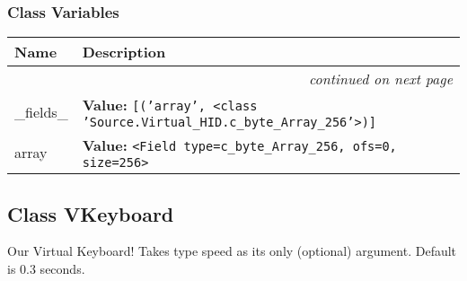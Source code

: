   \subsubsection{Class Variables}

    \vspace{-1cm}
\hspace{\varindent}\begin{longtable}{|p{\varnamewidth}|p{\vardescrwidth}|l}
\cline{1-2}
\cline{1-2} \centering \textbf{Name} & \centering \textbf{Description}& \\
\cline{1-2}
\endhead\cline{1-2}\multicolumn{3}{r}{\small\textit{continued on next page}}\\\endfoot\cline{1-2}
\endlastfoot\raggedright \_\-f\-i\-e\-l\-d\-s\-\_\- & \raggedright \textbf{Value:} 
{\tt \texttt{[}\texttt{(}\texttt{'}\texttt{array}\texttt{'}\texttt{, }{\textless}class 'Source.Virtual\_HID.c\_byte\_Array\_256'{\textgreater}\texttt{)}\texttt{]}}&\\
\cline{1-2}
\raggedright a\-r\-r\-a\-y\- & \raggedright \textbf{Value:} 
{\tt {\textless}Field type=c\_byte\_Array\_256, ofs=0, size=256{\textgreater}}&\\
\cline{1-2}
\end{longtable}



\subsection{Class VKeyboard}

    \label{GUIRobot:Source:Virtual_HID:VKeyboard}
Our Virtual Keyboard! Takes type speed as its only (optional) argument. 
Default is 0.3 seconds.



